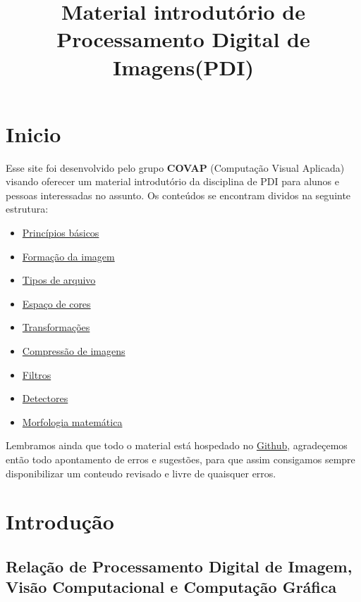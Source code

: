 \documentclass[
  brazilian,
]{book}
\title{Material introdutório de Processamento Digital de Imagens(PDI)}
\author{}
\date{\vspace{-2.5em}}
\providecommand{\tightlist}{%
  \setlength{\itemsep}{0pt}\setlength{\parskip}{0pt}}
\begin{document}
\maketitle

{
\setcounter{tocdepth}{1}
\tableofcontents
}
\hypertarget{inicio}{%
\chapter*{Inicio}\label{inicio}}

Esse site foi desenvolvido pelo grupo \textbf{COVAP} (Computação Visual Aplicada) visando oferecer um material introdutório da disciplina de PDI para alunos e pessoas interessadas no assunto.
Os conteúdos se encontram dividos na seguinte estrutura:

\begin{itemize}
\tightlist
\item
  \href{introducao.md}{Princípios básicos}
\item
  \href{formacao_imagem.md}{Formação da imagem}
\item
  \href{tipos_arquivos.md}{Tipos de arquivo}
\item
  \href{espaco_cores.md}{Espaço de cores}
\item
  \href{transformacoes.md}{Transformações}
\item
  \href{compressao_imagem.md}{Compressão de imagens}
\item
  \href{filtros.md}{Filtros}
\item
  \href{detectores.md}{Detectores}
\item
  \href{morfologia.md}{Morfologia matemática}
\end{itemize}

Lembramos ainda que todo o material está hospedado no \href{https://github.com/GilsonJRS/covap-pdi}{Github}, agradeçemos então todo apontamento de erros e sugestões, para que assim consigamos sempre disponibilizar um conteudo revisado e livre de quaisquer erros.

\hypertarget{intro}{%
\chapter{Introdução}\label{intro}}

\hypertarget{relauxe7uxe3o-de-processamento-digital-de-imagem-visuxe3o-computacional-e-computauxe7uxe3o-gruxe1fica}{%
\section{Relação de Processamento Digital de Imagem, Visão Computacional e Computação Gráfica}\label{relauxe7uxe3o-de-processamento-digital-de-imagem-visuxe3o-computacional-e-computauxe7uxe3o-gruxe1fica}}
\end{document}

